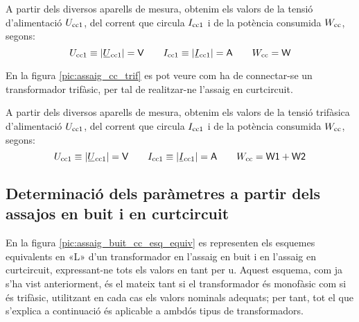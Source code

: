 A partir dels diversos aparells de mesura, obtenim els valors de la
tensió d'alimentació $U_\mathrm{cc1}$, del corrent que circula
$I_\mathrm{cc1}$ i de la potència consumida $W_\mathrm{cc}$, segons:
\begin{equation}
    U\ped{cc1}\equiv|\cmplx{U}\ped{cc1}|=\textsf{V} \qquad
    I\ped{cc1}\equiv|\cmplx{I}\ped{cc1}|=\textsf{A}
     \qquad W\ped{cc}=\textsf{W}
\end{equation}

En la figura \vref{pic:assaig_cc_trif} es pot veure com ha de
connectar-se un transformador trifàsic, per tal de realitzar-ne l'assaig en curtcircuit.

\begin{center}
    
    \label{pic:assaig_cc_trif}
\end{center}


A partir dels diversos aparells de mesura, obtenim els valors de la
tensió trifàsica d'alimentació $U_\mathrm{cc1}$, del corrent que circula
$I_\mathrm{cc1}$ i de la potència consumida $W_\mathrm{cc}$, segons:
\begin{equation}
    U\ped{cc1}\equiv|\cmplx{U}\ped{cc1}|=\textsf{V} \qquad
    I\ped{cc1}\equiv|\cmplx{I}\ped{cc1}|=\textsf{A} \qquad
    W\ped{cc}=\textsf{W1}+\textsf{W2}
\end{equation}

\subsection{Determinació dels paràmetres a partir dels assajos en buit i en curtcircuit}

En la figura \vref{pic:assaig_buit_cc_esq_equiv}  es representen els
esquemes equivalents en «L» d'un transformador en l'assaig en buit i
en l'assaig en curtcircuit, expressant-ne tots els valors en tant per u.
Aquest esquema, com ja s'ha vist anteriorment, és el mateix tant si
el transformador és monofàsic com si és trifàsic, utilitzant en cada
cas els valors nominals adequats; per tant, tot el que s'explica  a
continuació és aplicable a ambdós tipus de transformadors.

\begin{center}
    
     \label{pic:assaig_buit_cc_esq_equiv}
\end{center}

